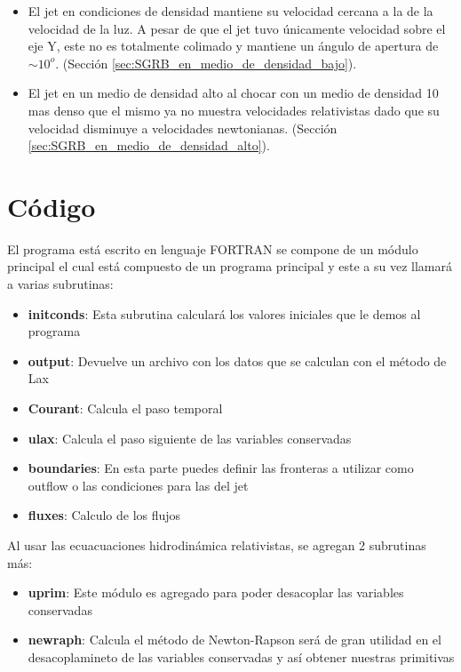 \documentclass[12pt,a4paper]{book}
\begin{document}
\begin{itemize}
\item El jet en condiciones de densidad mantiene su velocidad cercana a la de la velocidad de la luz. A pesar de que el jet tuvo únicamente velocidad sobre el eje Y, este no es totalmente colimado y mantiene un ángulo de apertura de $\sim 10^o$. (Sección \ref{sec:SGRB_en_medio_de_densidad_bajo}).

\item El jet en un medio de densidad alto al chocar con un medio de densidad 10 mas denso que el mismo ya no muestra velocidades relativistas dado que su velocidad disminuye a velocidades newtonianas. (Sección \ref{sec:SGRB_en_medio_de_densidad_alto}).


\end{itemize}


\appendix
\chapter{Código}\label{aped.A}

El programa está escrito en lenguaje FORTRAN se compone de un módulo principal el cual está compuesto de un programa principal y este a su vez llamará a varias subrutinas:
\begin{itemize}
\item \textbf{initconds}: Esta subrutina calculará los valores iniciales que le demos al programa

\item \textbf{output}: Devuelve un archivo con los datos que se calculan con el método de Lax

\item \textbf{Courant}: Calcula el paso temporal

\item \textbf{ulax}: Calcula el paso siguiente de las variables conservadas

\item \textbf{boundaries}: En esta parte puedes definir las fronteras a utilizar como outflow o las condiciones para las del jet

\item \textbf{fluxes}: Calculo de los flujos
\end{itemize}

Al usar las ecuacuaciones hidrodinámica relativistas, se agregan 2 subrutinas más:

\begin{itemize}
\item \textbf{uprim}: Este módulo es agregado para poder desacoplar las variables conservadas

\item \textbf{newraph}: Calcula el método de Newton-Rapson será de gran utilidad en el desacoplamineto de las variables conservadas y así obtener nuestras primitivas
\end{itemize}
\end{document}
